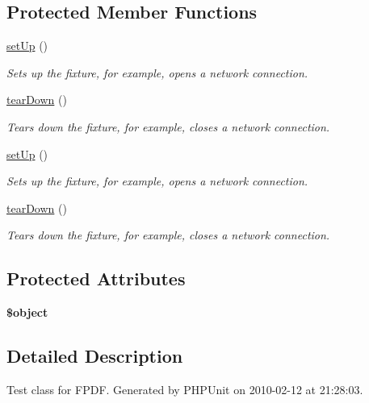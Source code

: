 \subsection*{Protected Member Functions}
\begin{DoxyCompactItemize}
\item 
\hyperlink{class_f_p_d_f_test_ad6893f3425a498f82116327794d75d55}{setUp} ()
\begin{DoxyCompactList}\small\item\em Sets up the fixture, for example, opens a network connection. \item\end{DoxyCompactList}\item 
\hyperlink{class_f_p_d_f_test_a8690ed285c35218c0206f4d4887819fa}{tearDown} ()
\begin{DoxyCompactList}\small\item\em Tears down the fixture, for example, closes a network connection. \item\end{DoxyCompactList}\item 
\hyperlink{class_f_p_d_f_test_ad6893f3425a498f82116327794d75d55}{setUp} ()
\begin{DoxyCompactList}\small\item\em Sets up the fixture, for example, opens a network connection. \item\end{DoxyCompactList}\item 
\hyperlink{class_f_p_d_f_test_a8690ed285c35218c0206f4d4887819fa}{tearDown} ()
\begin{DoxyCompactList}\small\item\em Tears down the fixture, for example, closes a network connection. \item\end{DoxyCompactList}\end{DoxyCompactItemize}
\subsection*{Protected Attributes}
\begin{DoxyCompactItemize}
\item 
\hypertarget{class_f_p_d_f_test_af19b9ab2d92d6d270d3f6c6723522013}{
{\bfseries \$object}}
\label{class_f_p_d_f_test_af19b9ab2d92d6d270d3f6c6723522013}

\end{DoxyCompactItemize}


\subsection{Detailed Description}
Test class for FPDF. Generated by PHPUnit on 2010-\/02-\/12 at 21:28:03.

